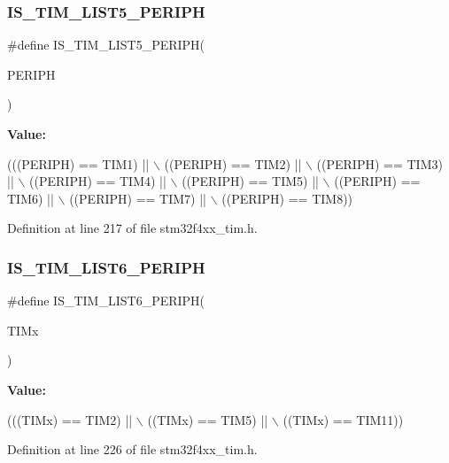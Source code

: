 \subsubsection{\texorpdfstring{I\+S\+\_\+\+T\+I\+M\+\_\+\+L\+I\+S\+T5\+\_\+\+P\+E\+R\+I\+PH}{IS\_TIM\_LIST5\_PERIPH}}
{\footnotesize\ttfamily \#define I\+S\+\_\+\+T\+I\+M\+\_\+\+L\+I\+S\+T5\+\_\+\+P\+E\+R\+I\+PH(\begin{DoxyParamCaption}\item[{}]{P\+E\+R\+I\+PH }\end{DoxyParamCaption})}

{\bfseries Value\+:}
\begin{DoxyCode}
(((PERIPH) == TIM1) || \(\backslash\)
                                     ((PERIPH) == TIM2) || \(\backslash\)
                                     ((PERIPH) == TIM3) || \(\backslash\)
                                     ((PERIPH) == TIM4) || \(\backslash\)
                                     ((PERIPH) == TIM5) || \(\backslash\)
                                     ((PERIPH) == TIM6) || \(\backslash\)
                                     ((PERIPH) == TIM7) || \(\backslash\)
                                     ((PERIPH) == TIM8))
\end{DoxyCode}


Definition at line 217 of file stm32f4xx\+\_\+tim.\+h.

\mbox{\label{group___t_i_m___exported__constants_ga9449f429a84af2291f431b990361e639}} 
\subsubsection{\texorpdfstring{I\+S\+\_\+\+T\+I\+M\+\_\+\+L\+I\+S\+T6\+\_\+\+P\+E\+R\+I\+PH}{IS\_TIM\_LIST6\_PERIPH}}
{\footnotesize\ttfamily \#define I\+S\+\_\+\+T\+I\+M\+\_\+\+L\+I\+S\+T6\+\_\+\+P\+E\+R\+I\+PH(\begin{DoxyParamCaption}\item[{}]{T\+I\+Mx }\end{DoxyParamCaption})}

{\bfseries Value\+:}
\begin{DoxyCode}
(((TIMx) == TIM2) || \(\backslash\)
                                 ((TIMx) == TIM5) || \(\backslash\)
                                 ((TIMx) == TIM11))
\end{DoxyCode}


Definition at line 226 of file stm32f4xx\+\_\+tim.\+h.

